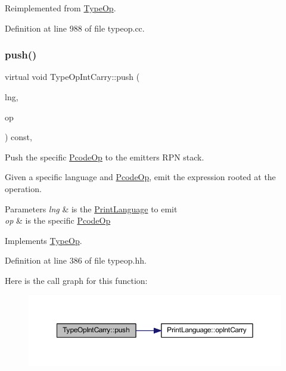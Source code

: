 Reimplemented from \mbox{\hyperlink{class_type_op_a42a1ffa77f998df24efdb44405b33ac5}{Type\+Op}}.



Definition at line 988 of file typeop.\+cc.

\mbox{\label{class_type_op_int_carry_adf5a7bd70606130b2bdd1d38d9019edc}} 
\subsubsection{\texorpdfstring{push()}{push()}}
{\footnotesize\ttfamily virtual void Type\+Op\+Int\+Carry\+::push (\begin{DoxyParamCaption}\item[{\mbox{\hyperlink{class_print_language}{Print\+Language}} $\ast$}]{lng,  }\item[{const \mbox{\hyperlink{class_pcode_op}{Pcode\+Op}} $\ast$}]{op }\end{DoxyParamCaption}) const\hspace{0.3cm}{\ttfamily [inline]}, {\ttfamily [virtual]}}



Push the specific \mbox{\hyperlink{class_pcode_op}{Pcode\+Op}} to the emitter\textquotesingle{}s R\+PN stack. 

Given a specific language and \mbox{\hyperlink{class_pcode_op}{Pcode\+Op}}, emit the expression rooted at the operation. 
\begin{DoxyParams}{Parameters}
{\em lng} & is the \mbox{\hyperlink{class_print_language}{Print\+Language}} to emit \\
\hline
{\em op} & is the specific \mbox{\hyperlink{class_pcode_op}{Pcode\+Op}} \\
\hline
\end{DoxyParams}


Implements \mbox{\hyperlink{class_type_op_ac9c9544203ed74dabe6ac662b653b2af}{Type\+Op}}.



Definition at line 386 of file typeop.\+hh.

Here is the call graph for this function\+:
\nopagebreak
\begin{figure}[H]
\begin{center}
\leavevmode
\includegraphics[width=350pt]{class_type_op_int_carry_adf5a7bd70606130b2bdd1d38d9019edc_cgraph}
\end{center}
\end{figure}


